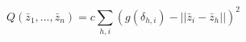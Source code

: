 \documentclass[a5paper]{article}
\begin{document}
\LARGE
\pagestyle{empty}

\[
Q(\bar{z}_1,...,\bar{z}_n)=c\sum_{h,i}(g(\delta_{h,i})-||\bar{z}_i-\bar{z}_h||)^2
\]
\end{document}
